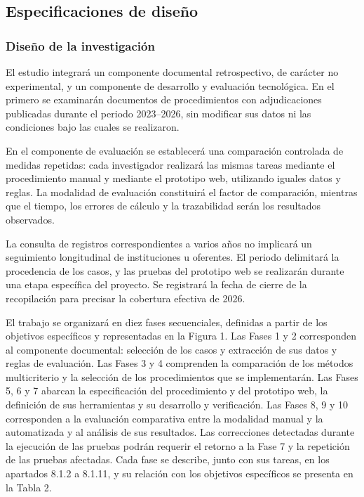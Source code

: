 \documentclass[12pt,a4paper]{article}
\begin{document}
\subsection{Especificaciones de diseño}



\subsubsection{Diseño de la investigación}

El estudio integrará un componente documental retrospectivo, de carácter no experimental, y un componente de desarrollo y evaluación tecnológica. En el primero se examinarán documentos de procedimientos con adjudicaciones publicadas durante el periodo 2023–2026, sin modificar sus datos ni las condiciones bajo las cuales se realizaron.

En el componente de evaluación se establecerá una comparación controlada de medidas repetidas: cada investigador realizará las mismas tareas mediante el procedimiento manual y mediante el prototipo web, utilizando iguales datos y reglas. La modalidad de evaluación constituirá el factor de comparación, mientras que el tiempo, los errores de cálculo y la trazabilidad serán los resultados observados.

La consulta de registros correspondientes a varios años no implicará un seguimiento longitudinal de instituciones u oferentes. El periodo delimitará la procedencia de los casos, y las pruebas del prototipo web se realizarán durante una etapa específica del proyecto. Se registrará la fecha de cierre de la recopilación para precisar la cobertura efectiva de 2026.

El trabajo se organizará en diez fases secuenciales, definidas a partir de los objetivos específicos y representadas en la Figura 1. Las Fases 1 y 2 corresponden al componente documental: selección de los casos y extracción de sus datos y reglas de evaluación. Las Fases 3 y 4 comprenden la comparación de los métodos multicriterio y la selección de los procedimientos que se implementarán. Las Fases 5, 6 y 7 abarcan la especificación del procedimiento y del prototipo web, la definición de sus herramientas y su desarrollo y verificación. Las Fases 8, 9 y 10 corresponden a la evaluación comparativa entre la modalidad manual y la automatizada y al análisis de sus resultados. Las correcciones detectadas durante la ejecución de las pruebas podrán requerir el retorno a la Fase 7 y la repetición de las pruebas afectadas. Cada fase se describe, junto con sus tareas, en los apartados 8.1.2 a 8.1.11, y su relación con los objetivos específicos se presenta en la Tabla 2.
\end{document}
